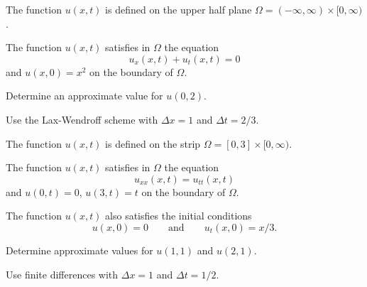 \begin{teilaufgaben}
\item
The function $u(x,t)$ is defined on the upper half plane
$\Omega = (-\infty,\infty) \times [0,\infty)$.

The function $u(x,t)$ satisfies in $\Omega$ the equation
\[
u_{x}(x,t) + u_{t}(x,t) = 0
\]
and  $u(x,0) = x^2$ on the boundary of $\Omega$.

Determine an approximate value for $u(0,2)$. 


Use the Lax-Wendroff scheme with $\Delta x = 1$ and $\Delta t = 2/3.$
\item
The function $u(x,t)$ is defined on the strip
$\Omega = [0, 3] \times [0,\infty)$.

The function $u(x,t)$ satisfies in $\Omega$ the equation
\[
u_{xx}(x,t) = u_{tt}(x,t)
\]
and  $u(0,t) = 0$, $u(3,t) = t$ on the boundary of $\Omega$. 

The function $u(x,t)$ also satisfies the initial conditions
\[
u(x,0) = 0
\qquad\text{and}\qquad
u_t(x,0) = x/3.
\]

Determine approximate values for $u(1,1)$ and $u(2,1)$.

Use finite differences with $\Delta x = 1$ and $\Delta t = 1/2.$
\end{teilaufgaben}

